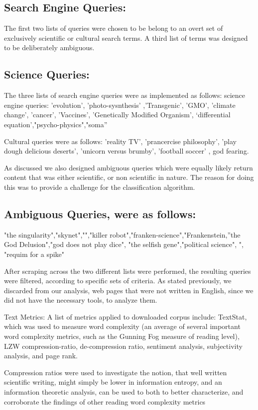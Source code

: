 \documentclass{clv3}
\begin{document}
\subsection{Search Engine Queries:}
The first two lists of queries were chosen to be belong to an overt set of exclusively scientific or cultural search terms. A third list of terms was designed to be deliberately ambiguous.

\subsection{Science Queries:}
The three lists of search engine queries were as implemented as follows: science engine queries: 'evolution', 'photo-sysnthesis' ,'Transgenic', 'GMO', 'climate change', 'cancer', 'Vaccines', 'Genetically Modified Organism', ‘differential equation’,"psycho-physics","soma”

Cultural queries were as follows: 'reality TV', 'prancercise philosophy', 'play dough delicious deserts', 'unicorn versus brumby', 'football soccer' , god fearing.

As discussed we also designed ambiguous queries which were equally likely return content that was either scientific, or non scientific in nature. The reason for doing this was to provide a challenge for the classification algorithm.

\subsection{Ambiguous Queries, were as follows:}

"the singularity","skynet","","killer robot","franken-science","Frankenstein,”the God Delusion","god does not play dice", "the selfish gene","political science", ", "requim for a spike"


After scraping across the two different lists were performed, the resulting queries were filtered, according to specific sets of criteria. As stated previously, we discarded from our analysis, web pages that were not written in English, since we did not have the necessary tools, to analyze them.

Text Metrics:
A list of metrics applied to downloaded corpus include: TextStat, which was used to measure word complexity (an average of several important word complexity metrics, such as the Gunning Fog measure of reading level), LZW compression-ratio, de-compression ratio, sentiment analysis, subjectivity analysis, and page rank.

Compression ratios were used to investigate the notion, that well written scientific writing, might simply be lower in information entropy, and an information theoretic analysis, can be used to both to better characterize, and corroborate the findings of other reading word complexity metrics
\end{document}
